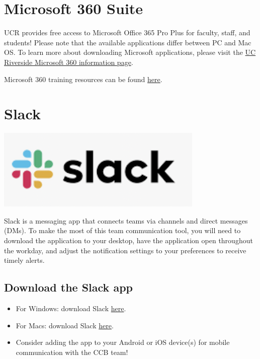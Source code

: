 \documentclass[
]{book}
\providecommand{\tightlist}{%
  \setlength{\itemsep}{0pt}\setlength{\parskip}{0pt}}
\begin{document}
\hypertarget{microsoft-360-suite}{%
\section{Microsoft 360 Suite}\label{microsoft-360-suite}}

UCR provides free access to Microsoft Office 365 Pro Plus for faculty, staff, and students! Please note that the available applications differ between PC and Mac OS. To learn more about downloading Microsoft applications, please visit the
\href{https://ucrsupport.service-now.com/ucr_portal/?id=kb_article\&sys_id=0868da980f602f0086b7c7dce1050ee0}{UC Riverside Microsoft 360 information page}.

Microsoft 360 training resources can be found \href{https://support.microsoft.com/en-us/training}{here}.

\hypertarget{slack}{%
\section{Slack}\label{slack}}

\begin{flushleft}\includegraphics[width=0.3\linewidth]{images/slack} \end{flushleft}

Slack is a messaging app that connects teams via channels and direct messages (DMs). To make the most of this team communication tool, you will need to download the application to your desktop, have the application open throughout the workday, and adjust the notification settings to your preferences to receive timely alerts.

\hypertarget{download-the-slack-app}{%
\subsection{Download the Slack app}\label{download-the-slack-app}}

\begin{itemize}
\tightlist
\item
  For Windows: download Slack \href{https://slack.com/downloads/windows}{here}.
\item
  For Macs: download Slack \href{https://slack.com/downloads/mac}{here}.
\item
  Consider adding the app to your Android or iOS device(s) for mobile communication with the CCB team!
\end{itemize}
\end{document}
